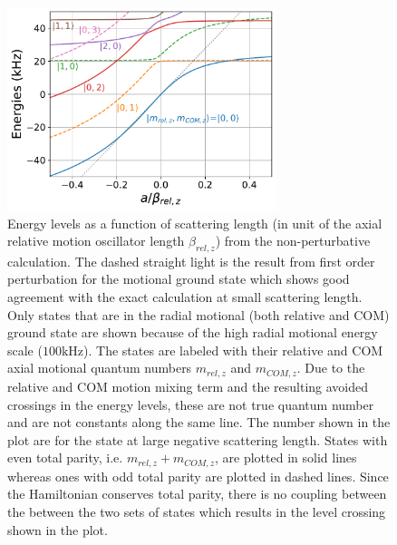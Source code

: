 \begin{figure}
  \centering
  \includegraphics[width=0.7\textwidth]{figures/interaction_shift_energies.pdf}
  \caption[Result of interaction shift calculation.]{
    Energy levels as a function of scattering length
    (in unit of the axial relative motion oscillator length
    $\beta_{rel,z}$) from the non-perturbative calculation.
    The dashed straight light is the result from first order perturbation
    for the motional ground state which shows good agreement with the exact calculation
    at small scattering length.
    Only states that are in the radial motional (both relative and COM) ground state
    are shown because of the high radial motional energy scale ($100\mathrm{kHz}$).
    The states are labeled with their relative and COM axial motional quantum numbers
    $m_{rel,z}$ and $m_{COM,z}$.
    Due to the relative and COM motion mixing term and the resulting avoided crossings
    in the energy levels, these are not true quantum number
    and are not constants along the same line.
    The number shown in the plot are for the state at large negative scattering length.
    States with even total parity, i.e. $m_{rel,z} + m_{COM,z}$, are plotted in solid lines
    whereas ones with odd total parity are plotted in dashed lines.
    Since the Hamiltonian conserves total parity,
    there is no coupling between the between the two sets of states
    which results in the level crossing shown in the plot.
    \label{fig:interaction-shift:energies}}
\end{figure}

